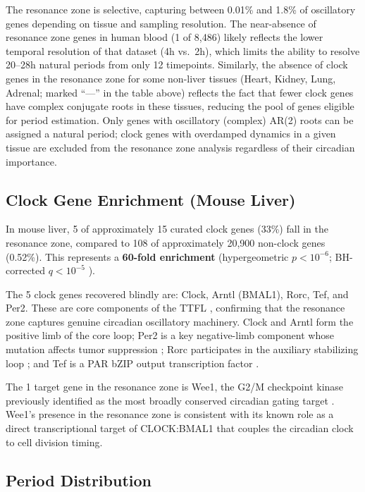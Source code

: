 \documentclass[11pt,letterpaper]{article}
\begin{document}
The resonance zone is selective, capturing between 0.01\% and 1.8\% of oscillatory genes depending on tissue and sampling resolution. The near-absence of resonance zone genes in human blood (1 of 8,486) likely reflects the lower temporal resolution of that dataset (4h vs.\ 2h), which limits the ability to resolve 20--28h natural periods from only 12 timepoints. Similarly, the absence of clock genes in the resonance zone for some non-liver tissues (Heart, Kidney, Lung, Adrenal; marked ``---'' in the table above) reflects the fact that fewer clock genes have complex conjugate roots in these tissues, reducing the pool of genes eligible for period estimation. Only genes with oscillatory (complex) AR(2) roots can be assigned a natural period; clock genes with overdamped dynamics in a given tissue are excluded from the resonance zone analysis regardless of their circadian importance.

\subsection{Clock Gene Enrichment (Mouse Liver)}

In mouse liver, 5 of approximately 15 curated clock genes (33\%) fall in the resonance zone, compared to 108 of approximately 20,900 non-clock genes (0.52\%). This represents a \textbf{60-fold enrichment} (hypergeometric $p < 10^{-6}$; BH-corrected $q < 10^{-5}$ \citep{benjamini1995controlling}).

The 5 clock genes recovered blindly are: Clock, Arntl (BMAL1), Rorc, Tef, and Per2. These are core components of the TTFL \citep{takahashi2017transcriptional, bunger2000mop3}, confirming that the resonance zone captures genuine circadian oscillatory machinery. Clock and Arntl form the positive limb of the core loop; Per2 is a key negative-limb component whose mutation affects tumor suppression \citep{fu2003circadian}; Rorc participates in the auxiliary stabilizing loop \citep{lowrey2011genetics}; and Tef is a PAR bZIP output transcription factor \citep{gachon2006parbzip}.

The 1 target gene in the resonance zone is Wee1, the G2/M checkpoint kinase previously identified as the most broadly conserved circadian gating target \citep{matsuo2003control}. Wee1's presence in the resonance zone is consistent with its known role as a direct transcriptional target of CLOCK:BMAL1 that couples the circadian clock to cell division timing.

\subsection{Period Distribution}
\end{document}
